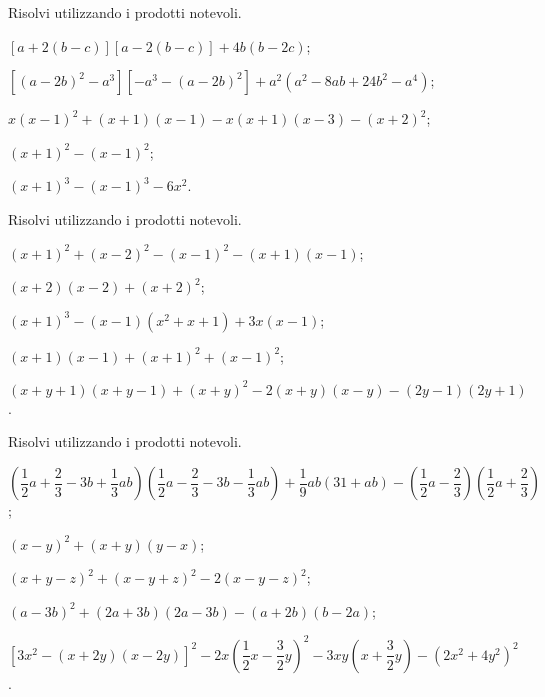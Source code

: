\begin{esercizio}[\Ast]
Risolvi utilizzando i prodotti notevoli.
 \begin{enumeratea}
 \item $\left[a+2\left(b-c\right)\right]\left[a-2\left(b-c\right)\right]+4b(b-2c)$;
 \item $\left[\left(a-2b\right)^{2}-a^{3}\right]\left[-a^{3}-\left(a-2b\right)^2\right]+a^{2}(a^{2}-8{ab}+24b^{2}-a^{4})$;
 \item $x(x-1)^{2}+(x+1)(x-1)-x(x+1)(x-3)-(x+2)^{2}$;
 \item $(x+1)^{2}-(x-1)^{2}$;
 \item $(x+1)^{3}-(x-1)^{3}-6x^2$.
 \end{enumeratea}
\end{esercizio}

\begin{esercizio}[\Ast]
Risolvi utilizzando i prodotti notevoli.
 \begin{enumeratea}
 \item $(x+1)^{2}+(x-2)^{2}-(x-1)^{2}-(x+1)(x-1)$;
 \item $(x+2)(x-2)+(x+2)^{2}$;
 \item $(x+1)^{3}-(x-1)\left(x^{2}+x+1\right)+3x(x-1)$;
 \item $(x+1)(x-1)+(x+1)^{2}+(x-1)^{2}$;
 \item $(x+y+1)(x+y-1)+(x+y)^{2}-2(x+y)(x-y)-(2y-1)(2y+1)$.
 \end{enumeratea}
\end{esercizio}

\begin{esercizio}[\Ast]
Risolvi utilizzando i prodotti notevoli.
 \begin{enumeratea}
 \item $\left(\dfrac{1}{2}a+\dfrac{2}{3}-3b+\dfrac{1}{3}{ab}\right)\left(\dfrac{1}{2}a-\dfrac{2}{3}-3b-\dfrac{1}{3}{ab}\right)+\dfrac{1}{9}{ab}(31+{ab})-\left(\dfrac{1}{2}a-\dfrac{2}{3}\right)\left(\dfrac{1}{2}a+\dfrac{2}{3}\right)$;
 \item $(x-y)^{2}+(x+y)(y-x)$;
 \item $(x+y-z)^2+(x-y+z)^2-2(x-y-z)^2$;
 \item $(a-3b)^{2}+(2a+3b)(2a-3b)-(a+2b)(b-2a)$;
 \item $\left[3x^{2}-(x+2y)(x-2y)\right]^{2}-2x\left(\dfrac{1}{2}x-\dfrac{3}{2}y\right)^{2}-3{xy}\left(x+\dfrac{3}{2}y\right)-\left(2x^{2}+4y^{2}\right)^{2}$.
 \end{enumeratea}
\end{esercizio}

